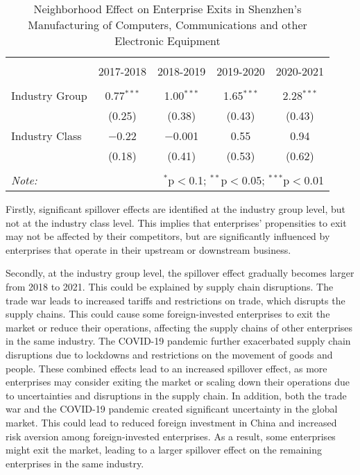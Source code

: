 \begin{table}[!htbp] \centering
  \caption{Neighborhood Effect on Enterprise Exits in Shenzhen's Manufacturing of Computers, Communications and other Electronic Equipment}
  \begin{tabular}{lcccc}
    \\[-1.8ex]\hline \hline \\[-1.8ex]
    & \multicolumn{1}{c}{2017-2018} & \multicolumn{1}{c}{2018-2019} & \multicolumn{1}{c}{2019-2020} & \multicolumn{1}{c}{2020-2021} \\
    \hline \\[-1.8ex]
    Industry Group & 0.77$^{***}$ & 1.00$^{***}$ & 1.65$^{***}$ & 2.28$^{***}$ \\
    & (0.25) & (0.38) & (0.43) & (0.43) \\
    Industry Class & $-$0.22 & $-$0.001 & 0.55 & 0.94 \\
    & (0.18) & (0.41) & (0.53) & (0.62) \\
    \hline \hline \\[-1.8ex]
    \textit{Note:}  & \multicolumn{4}{r}{$^{*}$p$<$0.1; $^{**}$p$<$0.05; $^{***}$p$<$0.01} \\
  \end{tabular}
\end{table}

Firstly, significant spillover effects are identified at the industry group level, but not at the industry class level. This implies that enterprises' propensities to exit may not be affected by their competitors, but are significantly influenced by enterprises that operate in their upstream or downstream business.

Secondly, at the industry group level, the spillover effect gradually becomes larger from 2018 to 2021. This could be explained by supply chain disruptions. The trade war leads to increased tariffs and restrictions on trade, which disrupts the supply chains. This could cause some foreign-invested enterprises to exit the market or reduce their operations, affecting the supply chains of other enterprises in the same industry. The COVID-19 pandemic further exacerbated supply chain disruptions due to lockdowns and restrictions on the movement of goods and people. These combined effects lead to an increased spillover effect, as more enterprises may consider exiting the market or scaling down their operations due to uncertainties and disruptions in the supply chain. In addition, both the trade war and the COVID-19 pandemic created significant uncertainty in the global market. This could lead to reduced foreign investment in China and increased risk aversion among foreign-invested enterprises. As a result, some enterprises might exit the market, leading to a larger spillover effect on the remaining enterprises in the same industry.

